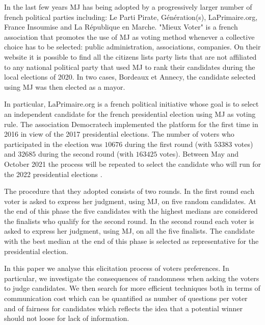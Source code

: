 \documentclass[version=3.21, pagesize, twoside=off, bibliography=totoc, DIV=calc, fontsize=12pt, a4paper]{scrartcl}
\begin{document}
In the last few years \acs{MJ} has being adopted by a progressively larger number of french political parties including: Le Parti Pirate, Génération(s), LaPrimaire.org, France Insoumise and La République en Marche.
"Mieux Voter" \citep{MV} is a french association that promotes the use of \acs{MJ} as voting method whenever a collective choice has to be selected: public administration, associations, companies. On their website it is possible to find all the citizens lists \textendash party lists that are not affiliated to any national political party \textemdash that used \acs{MJ} to rank their candidates during the local elections of 2020. In two cases, Bordeaux et Annecy, the candidate selected using \acs{MJ} was then elected as a mayor. 

In particular, LaPrimaire.org \citep{LaPrimaire} is a french political initiative whose goal is to select an independent candidate for the french presidential election using \acs{MJ} as voting rule. The association Democratech implemented the platform for the first time in 2016 in view of the 2017 presidential elections. The number of voters who participated in the election was $10676$ during the first round (with $53383$ votes) and $32685$ during the second round (with $163425$ votes). Between May and October 2021 the process will be repeated to select the candidate who will run for the 2022 presidential elections \citep{LaPrimaire2022}.

The procedure that they adopted consists of two rounds. In the first round each voter is asked to express her judgment, using \acs{MJ}, on five random candidates. At the end of this phase the five candidates with the highest medians are considered the finalists who qualify for the second round. In the second round each voter is asked to express her judgment, using \acs{MJ}, on all the five finalists. The candidate with the best median at the end of this phase is selected as representative for the presidential election.

In this paper we analyse this elicitation process of voters preferences. In particular, we investigate the consequences of randomness when asking the voters to judge candidates. We then search for more efficient techniques both in terms of communication cost \textemdash which can be quantified as number of questions per voter \textemdash and of fairness for candidates \textemdash which reflects the idea that a potential winner should not loose for lack of information.
\end{document}
